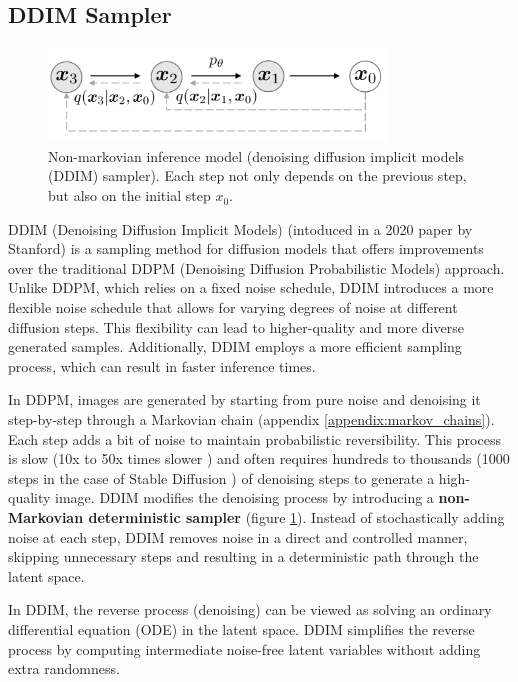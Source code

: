 \subsection{DDIM Sampler}

\begin{figure}
    \centering
    \includegraphics[width=0.8\textwidth]{images/diffusion_models/stable_diffusion/ddim_non_markov_process.png}
    \caption{Non-markovian inference model \cite{ddim} (denoising diffusion implicit models (DDIM) sampler). Each step not only depends on the previous step, but also on the initial step $x_0$.}
    \label{fig:ddim_non_markov_process}
\end{figure}

DDIM (Denoising Diffusion Implicit Models) (intoduced in a 2020 paper by Stanford) \cite{ddim} is a sampling method for diffusion models that offers improvements over the traditional DDPM (Denoising Diffusion Probabilistic Models) \cite{ddpm} approach. Unlike DDPM, which relies on a fixed noise schedule, DDIM introduces a more flexible noise schedule that allows for varying degrees of noise at different diffusion steps. This flexibility can lead to higher-quality and more diverse generated samples. Additionally, DDIM employs a more efficient sampling process, which can result in faster inference times.

In DDPM, images are generated by starting from pure noise and denoising it step-by-step through a Markovian chain (appendix \ref{appendix:markov_chains}). Each step adds a bit of noise to maintain probabilistic reversibility. This process is slow (10x to 50x times slower \cite{ddim}) and often requires hundreds to thousands (1000 steps in the case of Stable Diffusion \cite{stable_diffusion}) of denoising steps to generate a high-quality image. DDIM modifies the denoising process by introducing a \textbf{non-Markovian deterministic sampler} (figure \ref{fig:ddim_non_markov_process}). Instead of stochastically adding noise at each step, DDIM removes noise in a direct and controlled manner, skipping unnecessary steps and resulting in a deterministic path through the latent space.

In DDIM, the reverse process (denoising) can be viewed as solving an ordinary differential equation (ODE) in the latent space. DDIM simplifies the reverse process by computing intermediate noise-free latent variables without adding extra randomness.

